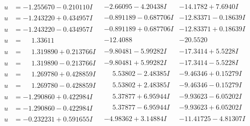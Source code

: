 \documentclass[1p]{elsarticle_modified}
\theoremstyle{definition}
\begin{document}
$$\begin{array}{c|c|c}
\begin{aligned}
u &= -1.255670 - 0.210110 I\end{aligned}
 & -2.66095 - 4.20438 I & -14.1782 + 7.6940 I \\ \hline\begin{aligned}
u &= -1.243220 + 0.434957 I\end{aligned}
 & -0.891189 - 0.687706 I & -12.83371 - 0.18639 I \\ \hline\begin{aligned}
u &= -1.243220 - 0.434957 I\end{aligned}
 & -0.891189 + 0.687706 I & -12.83371 + 0.18639 I \\ \hline\begin{aligned}
u &= \phantom{-}1.33611\phantom{ +0.000000I}\end{aligned}
 & -12.4088\phantom{ +0.000000I} & -20.5520\phantom{ +0.000000I} \\ \hline\begin{aligned}
u &= \phantom{-}1.319890 + 0.213766 I\end{aligned}
 & -9.80481 - 5.99282 I & -17.3414 + 5.5228 I \\ \hline\begin{aligned}
u &= \phantom{-}1.319890 - 0.213766 I\end{aligned}
 & -9.80481 + 5.99282 I & -17.3414 - 5.5228 I \\ \hline\begin{aligned}
u &= \phantom{-}1.269780 + 0.428859 I\end{aligned}
 & \phantom{-}5.53802 - 2.48385 I & -9.46346 + 0.15279 I \\ \hline\begin{aligned}
u &= \phantom{-}1.269780 - 0.428859 I\end{aligned}
 & \phantom{-}5.53802 + 2.48385 I & -9.46346 - 0.15279 I \\ \hline\begin{aligned}
u &= -1.290860 + 0.422984 I\end{aligned}
 & \phantom{-}5.37877 + 6.95944 I & -9.93623 - 6.05202 I \\ \hline\begin{aligned}
u &= -1.290860 - 0.422984 I\end{aligned}
 & \phantom{-}5.37877 - 6.95944 I & -9.93623 + 6.05202 I \\ \hline\begin{aligned}
u &= -0.232231 + 0.591655 I\end{aligned}
 & -4.98362 + 3.14884 I & -11.41725 - 4.81307 I \\ \hline\begin{aligned}

\end{aligned}
\end{array}$$
\end{document}
